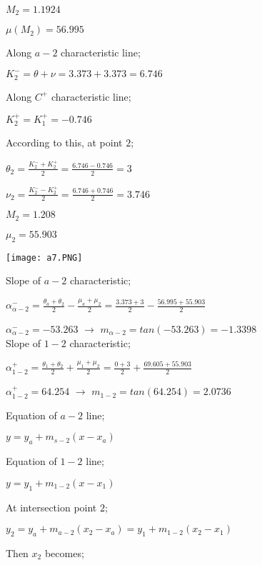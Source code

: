 \begin{appendices}
\begin{minipage}{0.65\textwidth}
$M_2=1.1924$

$\mu(M_2)=56.995$

Along $a-2$ characteristic line;

$K_2^- = \theta + \nu = 3.373 + 3.373 = 6.746$

Along $C^+$ characteristic line;

$K_2^+ = K_1^+ = -0.746$

According to this, at point $2$;

$\theta_2 = \frac{K_2^-+K_2^+}{2} = \frac{6.746-0.746}{2} = 3$

$\nu_2 = \frac{K_2^--K_2^+}{2} = \frac{6.746+0.746}{2} = 3.746$

$M_2 = 1.208$

$\mu_2 = 55.903$\\
	
\end{minipage}
\begin{minipage}{0.35\textwidth}
	\texttt{[image: a7.PNG]}
\end{minipage}%
\noindent


Slope of $a-2$ characteristic;

${\alpha}^{-}_{\alpha-2} = \frac{\theta_a+\theta_2}{2}-\frac{\mu_a+\mu_2}{2} = \frac{3.373+3}{2}-\frac{56.995+55.903}{2}$

${\alpha}_{\alpha-2}^{-} = -53.263 $ $\rightarrow$   $m_{\alpha-2} = tan(-53.263) = -1.3398$\\

Slope of $1-2$ characteristic;

${\alpha}^{+}_{1-2} = \frac{\theta_1+\theta_2}{2}+\frac{\mu_1+\mu_2}{2} = \frac{0+3}{2}+\frac{69.605+55.903}{2}$

${\alpha}_{1-2}^{+} = 64.254 $  $\rightarrow$   $m_{1-2} = tan(64.254) = 2.0736$\\

\pagebreak

\begin{minipage}{0.65\textwidth}
	
	Equation of $a-2$ line;
	
	$y=y_a+m_{s-2}(x-x_a)$
	
	Equation of $1-2$ line;
	
	$y=y_1+m_{1-2}(x-x_1)$
	
	At intersection point $2$;
	
	$y_2 = y_a + m_{a-2}(x_2-x_a)=y_1+m_{1-2}(x_2-x_1)$
	
	Then $x_2$ becomes;\\
	

\end{minipage}
\end{appendices}
